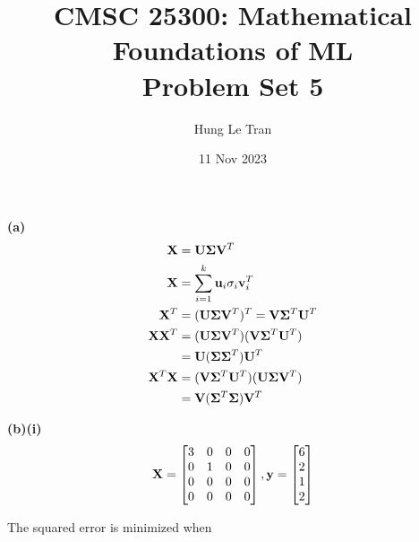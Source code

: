 \documentclass[a4paper, 12pt]{article}
\title{CMSC 25300: Mathematical Foundations of ML \\ \large Problem Set 5}
\date{11 Nov 2023}
\author{Hung Le Tran}
\begin{document}
\maketitle
\setcounter{section}{5}
\begin{problem} [Problem 1]
\end{problem}
\begin{solution}
    \textbf{(a)}
    \begin{align*}
        \mathbf{X}        & = \mathbf{U} \mathbf{\Sigma} \mathbf{V}^T                              \\
        \mathbf{X}        & = \sum_{i=1}^{k}\mathbf{u}_i \sigma_i \mathbf{v}_i^T            \\
        \mathbf{X}^T      & = (\mathbf{U} \mathbf{\Sigma} \mathbf{V}^T)^T = \mathbf{V} \mathbf{\Sigma}^T \mathbf{U}^T \\
        \mathbf{X} \mathbf{X}^T & = (\mathbf{U} \mathbf{\Sigma} \mathbf{V}^T)(\mathbf{V} \mathbf{\Sigma}^T \mathbf{U}^T )   \\
                    & = \mathbf{U} (\mathbf{\Sigma} \mathbf{\Sigma}^T) \mathbf{U}^T                 \\
        \mathbf{X}^T \mathbf{X} & = (\mathbf{V} \mathbf{\Sigma}^T \mathbf{U}^T )(\mathbf{U} \mathbf{\Sigma} \mathbf{V}^T)   \\
                    & = \mathbf{V} (\mathbf{\Sigma}^T \mathbf{\Sigma}) \mathbf{V}^T
    \end{align*}

    \textbf{(b)(i)}
    \[
        \mathbf{X} = \begin{bmatrix}
            3 & 0 & 0 & 0 \\
            0 & 1 & 0 & 0 \\
            0 & 0 & 0 & 0 \\
            0 & 0 & 0 & 0
        \end{bmatrix}, \mathbf{y} = \begin{bmatrix}
            6 \\ 2 \\ 1 \\ 2
        \end{bmatrix}
    \]

    The squared error is minimized when


\end{solution}
\end{document}
